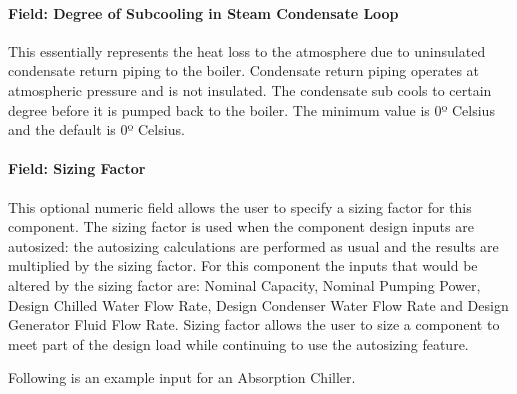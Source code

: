 \paragraph{Field: Degree of Subcooling in Steam Condensate Loop}\label{field-degree-of-subcooling-in-steam-condensate-loop}

This essentially represents the heat loss to the atmosphere due to uninsulated condensate return piping to the boiler. Condensate return piping operates at atmospheric pressure and is not insulated. The condensate sub cools to certain degree before it is pumped back to the boiler. The minimum value is 0º Celsius and the default is 0º Celsius.

\paragraph{Field: Sizing Factor}\label{field-sizing-factor-1-001}

This optional numeric field allows the user to specify a sizing factor for this component. The sizing factor is used when the component design inputs are autosized: the autosizing calculations are performed as usual and the results are multiplied by the sizing factor. For this component the inputs that would be altered by the sizing factor are: Nominal Capacity, Nominal Pumping Power, Design Chilled Water Flow Rate, Design Condenser Water Flow Rate and Design Generator Fluid Flow Rate. Sizing factor allows the user to size a component to meet part of the design load while continuing to use the autosizing feature.

Following is an example input for an Absorption Chiller.

